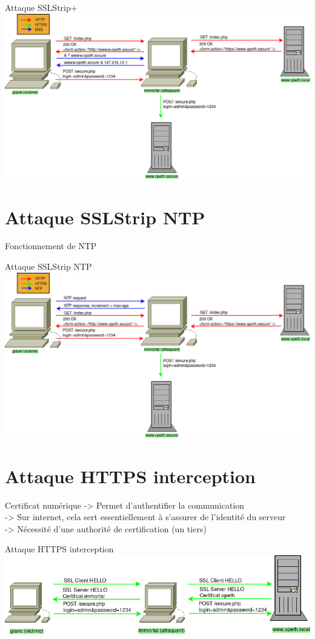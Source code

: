 \documentclass{beamer}
\begin{document}
\begin{frame}{Attaque SSLStrip+}
    \includegraphics[scale=0.32]{../medias/sslstrip2/attack.png}
\end{frame}

\section{Attaque SSLStrip NTP}

\begin{frame}{Fonctionnement de NTP}
\end{frame}

\begin{frame}{Attaque SSLStrip NTP}
    \includegraphics[scale=0.32]{../medias/sslstrip-ntp/attack.png}
\end{frame}

\section{Attaque HTTPS interception}

\begin{frame}{Certificat numérique}
    -> Permet d'authentifier la communication \\
    -> Sur internet, cela sert essentiellement à s'assurer de l'identité du serveur \\
    -> Nécessité d'une authorité de certification (un tiers) \\
\end{frame}

\begin{frame}{Attaque HTTPS interception}
    \includegraphics[scale=0.4]{../medias/https-interception/attack.png}
\end{frame}
\end{document}
